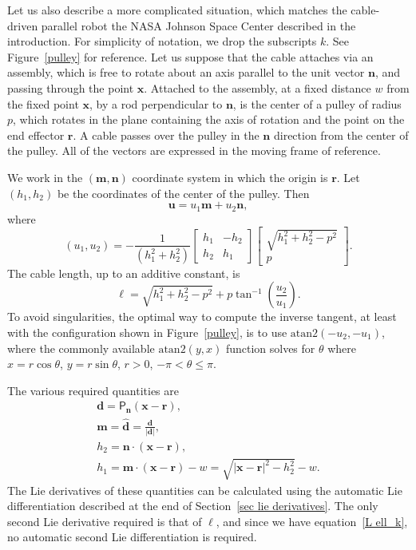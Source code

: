 \documentclass[reqno,12pt]{amsart}
\begin{document}
Let us also describe a more complicated situation, which matches the cable-driven parallel robot the NASA Johnson Space Center described in the introduction.  For simplicity of notation, we drop the subscripts $k$.  See Figure~\ref{pulley} for reference.  Let us suppose that the cable attaches via an assembly, which is free to rotate about an axis parallel to the unit vector $\bm n$, and passing through the point $\bm x$.  Attached to the assembly, at a fixed distance $w$ from the fixed point $\bm x$, by a rod perpendicular to $\bm n$, is the center of a pulley of radius $p$, which rotates in the plane containing the axis of rotation and the point on the end effector $\bm r$.  A cable passes over the pulley in the $\bm n$ direction from the center of the pulley.  All of the vectors are expressed in the moving frame of reference.

We work in the $(\bm m, \bm n)$ coordinate system in which the origin is $\bm r$.  Let $(h_1,h_2)$ be the coordinates of the center of the pulley.  Then
\begin{equation}
\bm u = u_1 \bm m + u_2 \bm n,
\end{equation}
where
\begin{equation}
(u_1, u_2) = - \frac1{(h_1^2+h_2^2)}
\begin{bmatrix}
h_1 & -h_2 \\
h_2 & h_1
\end{bmatrix}
\begin{bmatrix}
\sqrt{h_1^2+h_2^2 - p^2} \\ p
\end{bmatrix}.
\end{equation}
The cable length, up to an additive constant, is
\begin{equation}
\ell = \sqrt{h_1^2 + h_2^2 - p ^2} + p \tan^{-1}\left(\frac{u_2}{u_1}\right).
\end{equation}
To avoid singularities, the optimal way to compute the inverse tangent, at least with the configuration shown in Figure~\ref{pulley}, is to use $\text{atan2}(-u_2, -u_1)$, where the commonly available $\text{atan2}(y,x)$ function solves for $\theta$ where $x = r \cos\theta$, $y = r \sin\theta$, $ r > 0$, $-\pi < \theta \le \pi$.

The various required quantities are
\begin{gather}
\bm d = \mathsf P_{\bm n} (\bm x - \bm r) , \\ 
\bm m = \widehat{\bm d} = \frac{\bm d}{|\bm d|}, \\
h_2 = \bm n \cdot (\bm x - \bm r) , \\
h_1 = \bm m \cdot (\bm x - \bm r) - w = \sqrt{|\bm x - \bm r|^2 - h_2^2} - w .
\end{gather}
The Lie derivatives of these quantities can be calculated using the automatic Lie differentiation described at the end of Section~\ref{sec lie derivatives}.  The only second Lie derivative required is that of $\ell$, and since we have equation~\eqref{L ell_k}, no automatic second Lie differentiation is required.
\end{document}
